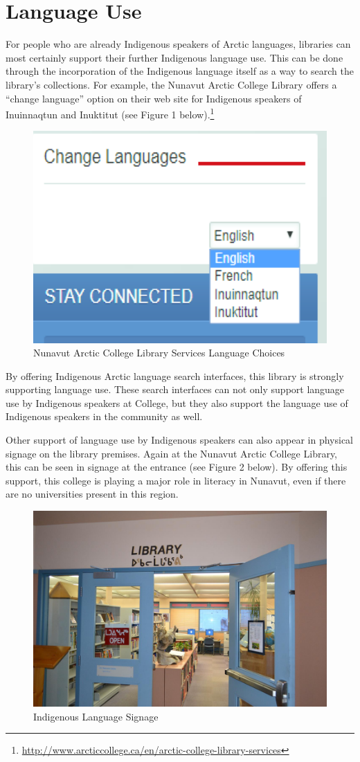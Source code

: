 \documentclass[a4paper,
fontsize=11pt,
oneside,
numbers=noperiodatend,
parskip=half-,
bibliography=totoc,
final
]{scrartcl}
\begin{document}
\hypertarget{language-use}{%
\section{Language Use}\label{language-use}}

For people who are already Indigenous speakers of Arctic languages,
libraries can most certainly support their further Indigenous language
use. This can be done through the incorporation of the Indigenous
language itself as a way to search the library's collections. For
example, the Nunavut Arctic College Library offers a \enquote{change
language} option on their web site for Indigenous speakers of
Inuinnaqtun and Inuktitut (see Figure 1 below).\footnote{\url{http://www.arcticcollege.ca/en/arctic-college-library-services}}

\begin{figure}
\centering
\includegraphics[width=.5\textwidth]{img/fig1.png}
\caption{Nunavut Arctic College Library Services Language Choices}
\end{figure}

By offering Indigenous Arctic language search interfaces, this library
is strongly supporting language use. These search interfaces can not
only support language use by Indigenous speakers at College, but they
also support the language use of Indigenous speakers in the community as
well.

Other support of language use by Indigenous speakers can also appear in
physical signage on the library premises. Again at the Nunavut Arctic
College Library, this can be seen in signage at the entrance (see Figure
2 below). By offering this support, this college is playing a major role
in literacy in Nunavut, even if there are no universities present in
this region.

\begin{figure}[h!]
\centering
\includegraphics[width=.7\textwidth]{img/fig2.png}
\caption{Indigenous Language Signage}
\end{figure}
\end{document}
